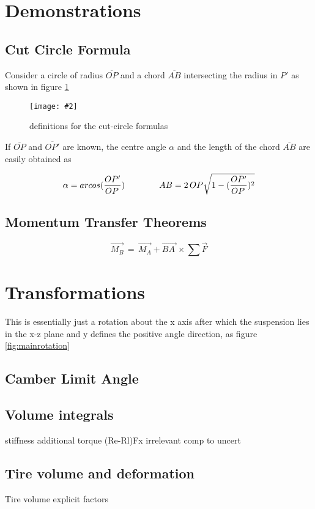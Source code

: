 \documentclass[12pt,a4paper]{report}
\newcommand{\figura}[5][htbp]{
\begin{figure}[#1]
\begin{center}
\texttt{[image: \#2]}
\caption{#4}\label{#5}
\end{center}
\end{figure}
}
\begin{document}
\section{Demonstrations}\label{apx:demos}

\subsection*{Cut Circle Formula}\label{apx:cutcircle}
Consider a circle of radius $\overline{OP}$ and a chord $\overline{AB}$ intersecting the radius in $P'$ as shown in figure \ref{fig:circleformula}

\figura{piczero.jpg}{}{definitions for the cut-circle formulas}{fig:circleformula}

If $\overline{OP}$ and $\overline{OP'}$ are known, the centre angle $\alpha$ and the length of the chord $\overline{AB}$ are easily obtained as

\begin{equation} \label{eqn:circle}
\alpha = arcos({OP' \over OP\,}) \qquad \qquad AB = 2\, OP \sqrt{1 - ({OP' \over OP\,})^2}
\end{equation}

\subsection*{Momentum Transfer Theorems}
\begin{equation} \label{eq:momtrans}
\vec{M_B} \, = \, \vec{M_A} + \overrightarrow{BA\:} \times \sum{\vec{F}}
\end{equation}
\section{Transformations}\label{apx:trans}
This is essentially just a rotation about the x axis after which the suspension lies in the x-z plane and y defines the positive angle direction, as figure \ref{fig:mainrotation}

\subsection*{Camber Limit Angle}\label{apx:camber}
\subsection{Volume integrals}
stiffness
additional torque (Re-Rl)Fx irrelevant comp to uncert
\subsection{Tire volume and deformation} \label{apx:tireshape}
Tire volume explicit factors

\nocite{*}


\end{document}
